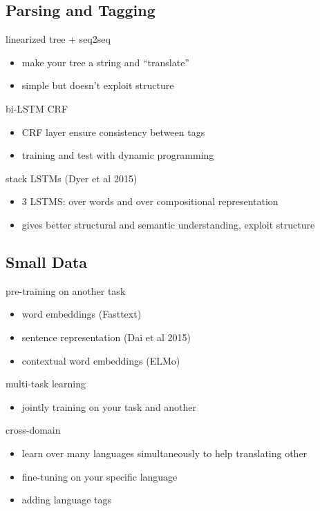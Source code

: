 \documentclass[]{article}
\theoremstyle{definition}
\begin{document}
    \subsection{Parsing and Tagging}%
    \label{sub:parsing}

    linearized tree + seq2seq
    \begin{itemize}
        \item make your tree a string and ``translate''
        \item simple but doesn't exploit structure
    \end{itemize}

    bi-LSTM CRF
    \begin{itemize}
        \item CRF layer ensure consistency between tags
        \item training and test with dynamic programming
    \end{itemize}

    stack LSTMs (Dyer et al 2015)
    \begin{itemize}
        \item 3 LSTMS: over words and over compositional representation
        \item gives better structural and semantic understanding, exploit structure
    \end{itemize}

    \subsection{Small Data}%
    \label{sub:small_data}

    pre-training on another task
    \begin{itemize}
        \item word embeddings (Fasttext)
        \item sentence representation (Dai et al 2015)
        \item contextual word embeddings (ELMo)
    \end{itemize}

    multi-task learning
    \begin{itemize}
        \item jointly training on your task and another
    \end{itemize}

    cross-domain
    \begin{itemize}
        \item learn over many languages simultaneously to help translating other
        \item fine-tuning on your specific language
        \item adding language tags
    \end{itemize}
\end{document}
